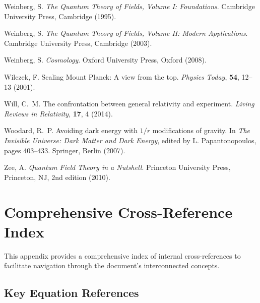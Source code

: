 \documentclass[12pt,a4paper]{article}
\begin{document}
\begin{thebibliography}{99}
		Weinberg, S.
		\newblock \textit{The Quantum Theory of Fields, Volume I: Foundations}.
		\newblock Cambridge University Press, Cambridge (1995).
		
		Weinberg, S.
		\newblock \textit{The Quantum Theory of Fields, Volume II: Modern Applications}.
		\newblock Cambridge University Press, Cambridge (2003).
		
		Weinberg, S.
		\newblock \textit{Cosmology}.
		\newblock Oxford University Press, Oxford (2008).
		
		Wilczek, F.
		\newblock Scaling Mount Planck: A view from the top.
		\newblock \textit{Physics Today}, \textbf{54}, 12--13 (2001).
		\newblock {}
		
		Will, C.~M.
		\newblock The confrontation between general relativity and experiment.
		\newblock \textit{Living Reviews in Relativity}, \textbf{17}, 4 (2014).
		\newblock {}
		
		Woodard, R.~P.
		\newblock Avoiding dark energy with $1/r$ modifications of gravity.
		\newblock In \textit{The Invisible Universe: Dark Matter and Dark Energy}, edited by L. Papantonopoulos, pages 403--433. Springer, Berlin (2007).
		\newblock {}
		
		Zee, A.
		\newblock \textit{Quantum Field Theory in a Nutshell}.
		\newblock Princeton University Press, Princeton, NJ, 2nd edition (2010).
		
	\end{thebibliography}
	
	\appendix
	
	\section{Comprehensive Cross-Reference Index}
	\label{app:cross_references}
	
	This appendix provides a comprehensive index of internal cross-references to facilitate navigation through the document's interconnected concepts.
	
	\subsection{Key Equation References}
	\label{app:key_equations}
	
\end{document}
